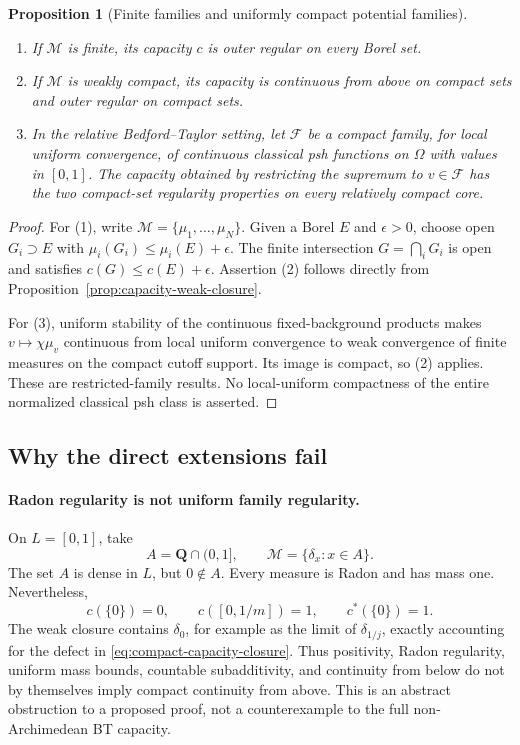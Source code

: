 \documentclass[11pt,a4paper]{article}
\numberwithin{equation}{section}
\newtheorem{proposition}[theorem]{Proposition}
\theoremstyle{definition}
\theoremstyle{remark}
\begin{document}
\begin{proposition}[Finite families and uniformly compact potential families]
\label{prop:restricted-family-regularity}
\begin{enumerate}
\item If $\mathcal M$ is finite, its capacity $c$ is outer regular
      on every Borel set.
\item If $\mathcal M$ is weakly compact, its capacity is continuous
      from above on compact sets and outer regular on compact sets.
\item In the relative Bedford--Taylor setting, let $\mathcal F$ be
      a compact family, for local uniform convergence, of continuous
      classical psh functions on $\Omega$ with values in $[0,1]$.
      The capacity obtained by restricting the supremum to
      $v\in\mathcal F$ has the two compact-set regularity properties
      on every relatively compact core.
\end{enumerate}
\end{proposition}

\begin{proof}
For (1), write $\mathcal M=\{\mu_1,\ldots,\mu_N\}$. Given a
Borel $E$ and $\epsilon>0$, choose open $G_i\supset E$ with
$\mu_i(G_i)\leq\mu_i(E)+\epsilon$. The finite intersection
$G=\bigcap_iG_i$ is open and satisfies
$c(G)\leq c(E)+\epsilon$. Assertion (2) follows directly from
Proposition~\ref{prop:capacity-weak-closure}.

For (3), uniform stability of the continuous fixed-background
products makes $v\mapsto\chi\mu_v$ continuous from local uniform
convergence to weak convergence of finite measures on the compact
cutoff support. Its image is compact, so (2) applies. These are
restricted-family results. No local-uniform compactness of the
entire normalized classical psh class is asserted.
\end{proof}

\subsection{Why the direct extensions fail}

\paragraph{Radon regularity is not uniform family regularity.}
On $L=[0,1]$, take
\[
 A=\mathbf Q\cap(0,1],\qquad
 \mathcal M=\{\delta_x:x\in A\}.
\]
The set $A$ is dense in $L$, but $0\notin A$. Every measure is Radon
and has mass one. Nevertheless,
\[
 c(\{0\})=0,\qquad c([0,1/m])=1,\qquad c^*(\{0\})=1.
\]
The weak closure contains $\delta_0$, for example as the limit of
$\delta_{1/j}$, exactly accounting for the
defect in \eqref{eq:compact-capacity-closure}. Thus positivity,
Radon regularity, uniform mass bounds, countable subadditivity, and
continuity from below do not by themselves imply compact continuity
from above. This is an abstract obstruction to a proposed proof,
not a counterexample to the full non-Archimedean BT capacity.
\end{document}
